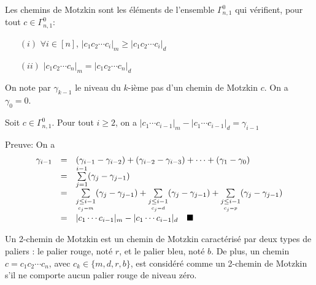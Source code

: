 \begin{definition}
	\begin{rm}
		Les chemins de Motzkin sont les éléments de l'ensemble $\Gamma_{n,1}^{0}$ qui vérifient, pour tout $c \in \Gamma_{n,1}^{0}$:
		\begin{itemize}
			\item[$(i)$] $\forall i \in [n]$, $|c_{1}c_{2}\cdots c_{i}|_{m} \geq |c_{1}c_{2}\cdots c_{i}|_{d} $
			\item[$(ii)$] $|c_{1}c_{2}\cdots c_{n}|_{m} = |c_{1}c_{2}\cdots c_{n}|_{d} $
		\end{itemize}
	\end{rm}
\end{definition}
On note par $\gamma_{k-1}$ le niveau du $k$-ième pas d'un chemin de Motzkin $c$. On a $\gamma_{0} = 0$.
\newpage
\begin{proposition} \label{levelOfPath}
	Soit $c \in \Gamma_{n,1}^{0}$. Pour tout $i \geq 2$, on a $|c_{1} \cdots c_{i-1}|_{m} - |c_{1} \cdots c_{i-1}|_{d} = \gamma_{i-1}$
\end{proposition}
Preuve: On a \\
$$
	\begin{array}{c c l}
		\gamma_{i-1} & = & (\gamma_{i-1}-\gamma_{i-2})+(\gamma_{i-2}-\gamma_{i-3})+\cdots+(\gamma_{1}-\gamma_{0})                           \\
		             & = & \underset{j=1}{\overset{i-1}{\sum}}(\gamma_{j}-\gamma_{j-1})                                                     \\
		             & = & \underset{\underset{c_{j}=m}{j\leq i-1}}{\sum}(\gamma_{j}-\gamma_{j-1})+\underset{\underset{c_{j}=d}{j\leq i-1}}
		{\sum}(\gamma_{j}-\gamma_{j-1})+\underset{\underset{c_{j}=p}{j\leq i-1}}{\sum}(\gamma_{j}-\gamma_{j-1})                             \\
		             & = & |c_{1}\cdots c_{i-1}|_m-|c_{1}\cdots c_{i-1}|_d \hspace{10pt}\blacksquare
	\end{array}
$$
\vspace{5pt}
\begin{definition}
	\begin{rm}
		Un 2-chemin de Motzkin est un chemin de Motzkin caractérisé par deux types de paliers : le palier rouge, noté $r$, et le palier bleu, noté $b$. De plus, un chemin $c = c_{1}c_{2}\cdots c_{n}$, avec $c_{k} \in \{m, d, r, b\}$, est considéré comme un 2-chemin de Motzkin s'il ne comporte aucun palier rouge de niveau zéro.
	\end{rm}
\end{definition}

